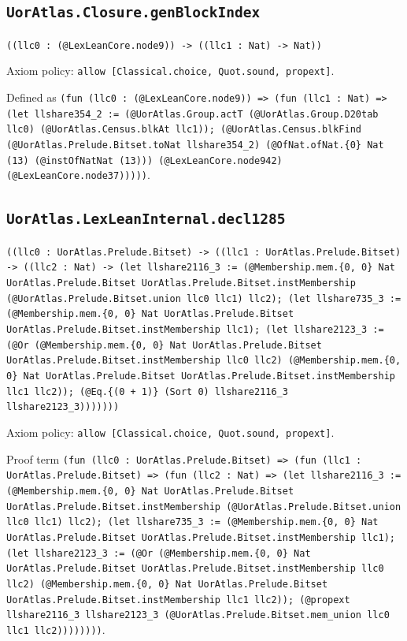 \documentclass[11pt]{article}
\begin{document}
\subsection*{\texttt{UorAtlas.Closure.genBlockIndex}}
\noindent\texttt{((llc0 : (@LexLeanCore.node9)) -> ((llc1 : Nat) -> Nat))}\par
\noindent Axiom policy: \texttt{allow [Classical.choice, Quot.sound, propext]}.\par
\noindent Defined as \texttt{(fun (llc0 : (@LexLeanCore.node9)) => (fun (llc1 : Nat) => (let llshare354\_2 := (@UorAtlas.Group.actT (@UorAtlas.Group.D20tab llc0) (@UorAtlas.Census.blkAt llc1)); (@UorAtlas.Census.blkFind (@UorAtlas.Prelude.Bitset.toNat llshare354\_2) (@OfNat.ofNat.\{0\} Nat (13) (@instOfNatNat (13))) (@LexLeanCore.node942) (@LexLeanCore.node37)))))}.\par
\subsection*{\texttt{UorAtlas.LexLeanInternal.decl1285}}
\noindent\texttt{((llc0 : UorAtlas.Prelude.Bitset) -> ((llc1 : UorAtlas.Prelude.Bitset) -> ((llc2 : Nat) -> (let llshare2116\_3 := (@Membership.mem.\{0, 0\} Nat UorAtlas.Prelude.Bitset UorAtlas.Prelude.Bitset.instMembership (@UorAtlas.Prelude.Bitset.union llc0 llc1) llc2); (let llshare735\_3 := (@Membership.mem.\{0, 0\} Nat UorAtlas.Prelude.Bitset UorAtlas.Prelude.Bitset.instMembership llc1); (let llshare2123\_3 := (@Or (@Membership.mem.\{0, 0\} Nat UorAtlas.Prelude.Bitset UorAtlas.Prelude.Bitset.instMembership llc0 llc2) (@Membership.mem.\{0, 0\} Nat UorAtlas.Prelude.Bitset UorAtlas.Prelude.Bitset.instMembership llc1 llc2)); (@Eq.\{(0 + 1)\} (Sort 0) llshare2116\_3 llshare2123\_3)))))))}\par
\noindent Axiom policy: \texttt{allow [Classical.choice, Quot.sound, propext]}.\par
\noindent Proof term \texttt{(fun (llc0 : UorAtlas.Prelude.Bitset) => (fun (llc1 : UorAtlas.Prelude.Bitset) => (fun (llc2 : Nat) => (let llshare2116\_3 := (@Membership.mem.\{0, 0\} Nat UorAtlas.Prelude.Bitset UorAtlas.Prelude.Bitset.instMembership (@UorAtlas.Prelude.Bitset.union llc0 llc1) llc2); (let llshare735\_3 := (@Membership.mem.\{0, 0\} Nat UorAtlas.Prelude.Bitset UorAtlas.Prelude.Bitset.instMembership llc1); (let llshare2123\_3 := (@Or (@Membership.mem.\{0, 0\} Nat UorAtlas.Prelude.Bitset UorAtlas.Prelude.Bitset.instMembership llc0 llc2) (@Membership.mem.\{0, 0\} Nat UorAtlas.Prelude.Bitset UorAtlas.Prelude.Bitset.instMembership llc1 llc2)); (@propext llshare2116\_3 llshare2123\_3 (@UorAtlas.Prelude.Bitset.mem\_union llc0 llc1 llc2))))))))}.\par
\end{document}
